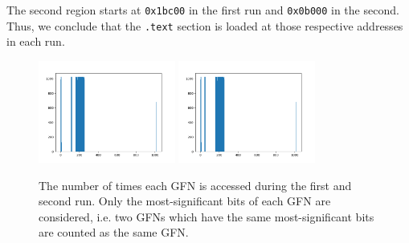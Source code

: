 \documentclass[sheet=1, english]{dexercise}
\begin{document}
\begin{enumerate}
    The second region starts at \texttt{0x1bc00} in the first run and \texttt{0x0b000} in the second.
    Thus, we conclude that the \texttt{.text} section is loaded at those respective addresses in each run.

    \begin{figure}
        \centering
        \includegraphics[width=0.4\textwidth]{run1.png}
        \includegraphics[width=0.4\textwidth]{run2.png}
        \caption{The number of times each GFN is accessed during the first and
        second run. Only the most-significant bits of each GFN are considered, i.e.
        two GFNs which have the same most-significant bits are counted as the same GFN.}
        \label{fig:runs}
    \end{figure}
\end{enumerate}
\end{document}
